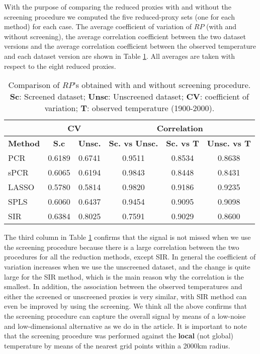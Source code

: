 \documentclass[11pt]{article}
\begin{document}
\begin{itemize}
With the purpose of comparing the reduced proxies with and without the
screening procedure we computed the five reduced-proxy sets (one for each
method) for each case. The average coefficient of variation of $RP$ (with and
without screening), the
average correlation coefficient between the two dataset versions and the average
correlation coefficient between the observed temperature and each dataset
version are shown in Table \ref{tab:screening}. All averages are taken with respect to the eight reduced proxies.
\begin{table}
  \centering
  \begin{tabular}{l|cc|c|cc}
  \toprule
 &  \multicolumn{2}{c|}{CV} & \multicolumn{3}{c}{Correlation}\\
 \hline
\textbf{Method} & \textbf{S.c} & \textbf{Unsc.} & \textbf{Sc. vs Unsc.} & \textbf{Sc. vs T} & \textbf{Unsc. vs T}\\ 
  \midrule
PCR & 0.6189 & 0.6741 & 0.9511 & 0.8534 & 0.8638 \\ 
  sPCR & 0.6065 & 0.6194 & 0.9843 & 0.8448 & 0.8431 \\ 
  LASSO & 0.5780 & 0.5814 & 0.9820 & 0.9186 & 0.9235 \\ 
  SPLS & 0.6060 & 0.6437 & 0.9454 & 0.9095 & 0.9098 \\ 
  SIR & 0.6384 & 0.8025 & 0.7591 & 0.9029 & 0.8600 \\ 
   \bottomrule
\end{tabular}
  \caption{Comparison of $RP$'s obtained with and without screening procedure. \textbf{Sc}: Screened dataset; \textbf{Unsc}: Unscreened dataset; \textbf{CV}: coefficient of variation; \textbf{T}: observed temperature (1900-2000). }
  \label{tab:screening}
\end{table}
The third column in Table \ref{tab:screening} confirms that the signal is not missed when we
use the screening procedure because there is a large correlation between the two
procedures for all the reduction methods, except SIR. In general the coefficient
of variation increases when we use the unscreened dataset, and the change is
quite large for the SIR method, which is the main reason why the correlation is
the smallest. In addition, the association between the observed temperatures and
either the screened or unscreened proxies is very similar, with SIR method can even be improved
by using the screening. We think all the above confirms that the screening procedure can capture
the overall signal by means of a low-noise and low-dimensional alternative as we
do in the article. It is important to note that the screening procedure was
performed against the \textbf{local} (not global) temperature by means of the nearest grid points
within a 2000km radius.       



\end{itemize}
\end{document}
